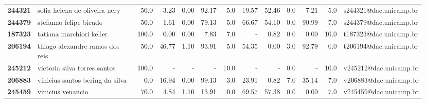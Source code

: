 \documentclass[11pt]{article}
\begin{document}
\begin{center}
\begin{landscape}
\begin{longtable}{llrrrrrrrrrrl}
\textbf{244321} &         sofia helena de oliveira nery &                  50.0 &        3.23 &        0.00 &       92.17 &                      5.0 &       19.57 &       52.46 &                        0.0 &        7.21 &                      5.0 &  s244321@dac.unicamp.br \\
\textbf{244379} &                stefanno felipe bicudo &                  50.0 &        1.61 &        0.00 &       79.13 &                      5.0 &       66.67 &       54.10 &                        0.0 &       90.99 &                      7.0 &  s244379@dac.unicamp.br \\
\textbf{187323} &              tatiana marchiori keller &                 100.0 &        0.00 &        0.00 &        7.83 &                      7.0 &           - &        0.82 &                        0.0 &        0.00 &                     10.0 &  t187323@dac.unicamp.br \\
\textbf{206194} &       thiago alexandre ramos dos reis &                  50.0 &       46.77 &        1.10 &       93.91 &                      5.0 &       54.35 &        0.00 &                        3.0 &       92.79 &                      0.0 &  t206194@dac.unicamp.br \\
\textbf{245212} &          victoria silva torres santos &                 100.0 &           - &           - &           - &                     10.0 &           - &           - &                        0.0 &           - &                     10.0 &  v245212@dac.unicamp.br \\
\textbf{206883} &       vinicius santos bering da silva &                   0.0 &       16.94 &        0.00 &       99.13 &                      3.0 &       23.91 &        0.82 &                        7.0 &       35.14 &                      7.0 &  v206883@dac.unicamp.br \\
\textbf{245459} &                     vinicius venancio &                  70.0 &        4.84 &        1.10 &       13.91 &                      0.0 &       69.57 &       57.38 &                        0.0 &        0.00 &                      7.0 &  v245459@dac.unicamp.br \\
\end{longtable}
\end{landscape}\end{center}
\end{document}
